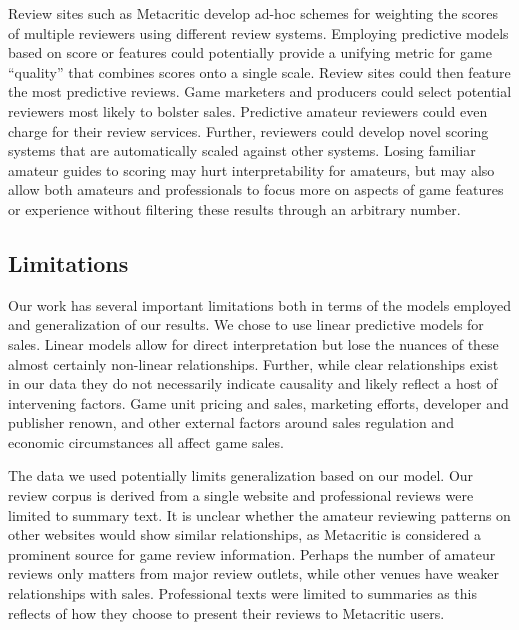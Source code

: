 \documentclass{sig-alternate}
\begin{document}
Review sites such as Metacritic develop ad-hoc schemes for weighting the scores of multiple reviewers using different review systems. Employing predictive models based on score or features could potentially provide a unifying metric for game ``quality'' that combines scores onto a single scale. Review sites could then feature the most predictive reviews. Game marketers and producers could select potential reviewers most likely to bolster sales. Predictive amateur reviewers could even charge for their review services. Further, reviewers could develop novel scoring systems that are automatically scaled against other systems. Losing familiar amateur guides to scoring may hurt interpretability for amateurs, but may also allow both amateurs and professionals to focus more on aspects of game features or experience without filtering these results through an arbitrary number.


\subsection{Limitations}
Our work has several important limitations both in terms of the models
employed and generalization of our results. We chose to use linear
predictive models for sales. Linear models allow for direct
interpretation but lose the nuances of these almost certainly non-linear
relationships. Further, while clear relationships exist in our data they
do not necessarily indicate causality and likely reflect a host of
intervening factors. Game unit pricing and sales, marketing efforts,
developer and publisher renown, and other external factors around sales
regulation and economic circumstances all affect game sales. 

The data we used potentially limits generalization based on our model.
Our review corpus is derived from a single website and professional
reviews were limited to summary text. It is unclear whether the amateur
reviewing patterns on other websites would show similar relationships, as Metacritic is considered a prominent source for game review information. Perhaps the number of amateur reviews only matters from major review outlets, while other venues have weaker relationships with sales.
Professional texts were limited to summaries as this reflects of how they choose to present their reviews to Metacritic users.
\end{document}
